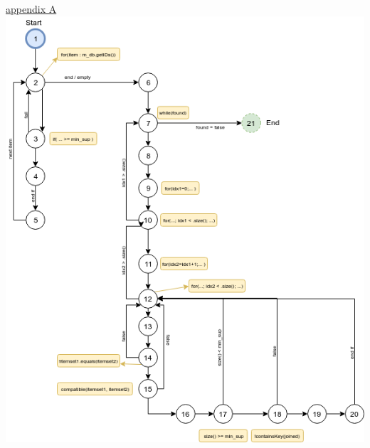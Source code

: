 \documentclass{article}
\begin{document}
\newpage
\maketitle
\noindent
\underline{appendix A}\newline
\newline
\includegraphics[width=\textwidth]{control_flow_graph}
\end{document}
